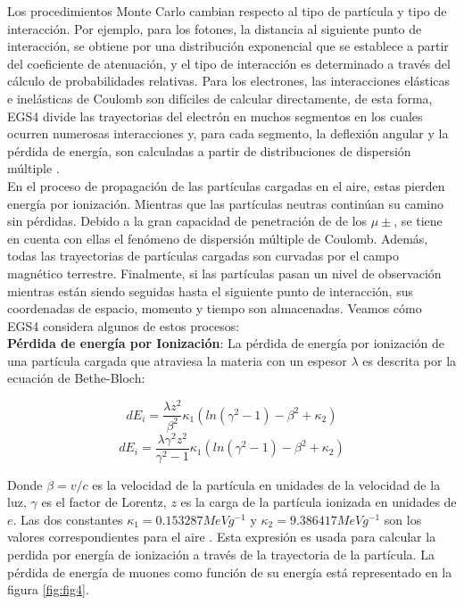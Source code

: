 Los procedimientos Monte Carlo cambian respecto al tipo de partícula y tipo de interacción. Por ejemplo, para los fotones, la distancia al siguiente punto de interacción, se obtiene por una distribución exponencial que se establece a partir del coeficiente de atenuación, y el tipo de interacción es determinado a través del cálculo de probabilidades relativas. Para los electrones, las interacciones elásticas e inelásticas de Coulomb son difíciles de calcular directamente, de esta forma, EGS4 divide las trayectorias del electrón en muchos segmentos en los cuales ocurren numerosas interacciones y, para cada segmento, la deflexión angular y la pérdida de energía, son calculadas a partir de distribuciones de dispersión múltiple \cite{EGS4book}.  \\

En el proceso de propagación de las partículas cargadas en el aire, estas pierden energía por ionización. Mientras que las partículas neutras continúan su camino sin pérdidas. Debido a la gran capacidad de penetración de de los $\mu\pm $, se tiene en cuenta con ellas el fenómeno de dispersión múltiple de Coulomb. Además, todas las trayectorias de partículas cargadas son curvadas por el campo magnético terrestre. Finalmente, si las partículas pasan un nivel de observación mientras están siendo seguidas  hasta el siguiente punto de interacción, sus coordenadas de espacio, momento y tiempo son almacenadas. Veamos cómo EGS4 considera algunos de estos procesos:\\

\textbf{Pérdida de energía por Ionización}: La pérdida de energía por ionización de una partícula cargada que atraviesa la materia con un espesor $\lambda$ es descrita por la ecuación de Bethe-Bloch:

\begin{equation*}
dE_{i} =  \frac{\lambda z^{2}}{\beta^{2}}\kappa_{1}(ln(\gamma^{2}-1)- \beta^{2}+\kappa_{2})
\end{equation*}
%
\begin{equation}
dE_{i} = \frac{\lambda \gamma^{2}z^{2}}{\gamma^{2}-1}\kappa_{1}(ln(\gamma^{2}-1)- \beta^{2}+\kappa_{2})
\label{eq:eq20}
\end{equation}

Donde $\beta = v/c $ es la velocidad de la partícula en unidades de la velocidad de la luz, $\gamma$ es el factor de Lorentz, $z$ es la carga de la partícula ionizada en unidades de $e$. Las dos constantes $\kappa_{1}= 0.153287 MeV g^{-1}$ y $\kappa_{2}= 9.386417 MeV g^{-1}$ son los valores correspondientes para el aire \cite{Heck1998}. Esta expresión es usada para calcular la perdida por energía de ionización a través de la trayectoria de la partícula. La pérdida de energía de muones como función de su energía está representado en la figura \ref{fig:fig4}.\\

